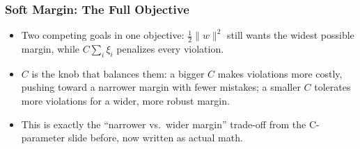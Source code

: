\begin{frame}[fragile] \frametitle{Soft Margin: The Full Objective}
\begin{center}
\end{center}
\begin{itemize}
\item Two competing goals in one objective: $\frac{1}{2}\|w\|^2$ still wants the widest possible margin, while $C\sum_i \xi_i$ penalizes every violation.
\item $C$ is the knob that balances them: a bigger $C$ makes violations more costly, pushing toward a narrower margin with fewer mistakes; a smaller $C$ tolerates more violations for a wider, more robust margin.
\item This is exactly the ``narrower vs.\ wider margin'' trade-off from the C-parameter slide before, now written as actual math.
\end{itemize}
\end{frame}



